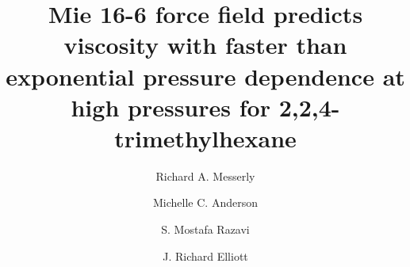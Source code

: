 \documentclass[preprint,review,12pt]{elsarticle}
\begin{document}
	
	\begin{frontmatter}
		
		
		
        \title{Mie 16-6 force field predicts viscosity with faster than exponential pressure dependence at high pressures for 2,2,4-trimethylhexane}
				
		
		\author{Richard A. Messerly}
		\address{Thermodynamics Research Center, National Institute of Standards and Technology, Boulder, Colorado, 80305}
		
		\author{Michelle C. Anderson}
		\address{Thermodynamics Research Center, National Institute of Standards and Technology, Boulder, Colorado, 80305}
		
		\author{S. Mostafa Razavi}
		\address{Department of Chemical and Biomolecular Engineering, The University of Akron, Akron, Ohio, 44325-3906}
		
		\author{J. Richard Elliott}
		\address{Department of Chemical and Biomolecular Engineering, The University of Akron, Akron, Ohio, 44325-3906}
		

\end{frontmatter}
\end{document}
